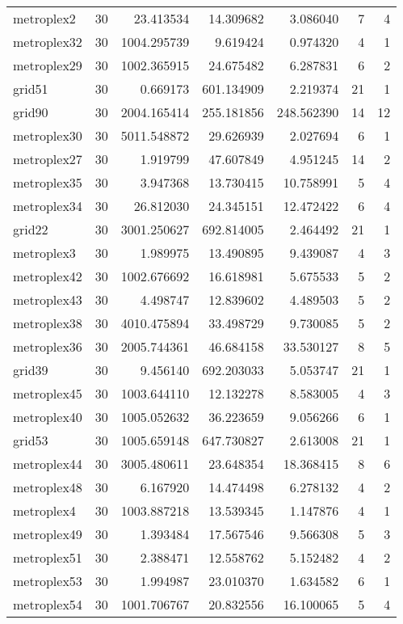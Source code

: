 \documentclass[../../../thesis.tex]{subfiles}
\begin{document}
\begin{longtable}{|l|r|r|r|r|r|r|}
metroplex2 & 30 & 23.413534 & 14.309682 & 3.086040 & 7 & 4 \\
metroplex32 & 30 & 1004.295739 & 9.619424 & 0.974320 & 4 & 1 \\
metroplex29 & 30 & 1002.365915 & 24.675482 & 6.287831 & 6 & 2 \\
grid51 & 30 & 0.669173 & 601.134909 & 2.219374 & 21 & 1 \\
grid90 & 30 & 2004.165414 & 255.181856 & 248.562390 & 14 & 12 \\
metroplex30 & 30 & 5011.548872 & 29.626939 & 2.027694 & 6 & 1 \\
metroplex27 & 30 & 1.919799 & 47.607849 & 4.951245 & 14 & 2 \\
metroplex35 & 30 & 3.947368 & 13.730415 & 10.758991 & 5 & 4 \\
metroplex34 & 30 & 26.812030 & 24.345151 & 12.472422 & 6 & 4 \\
grid22 & 30 & 3001.250627 & 692.814005 & 2.464492 & 21 & 1 \\
metroplex3 & 30 & 1.989975 & 13.490895 & 9.439087 & 4 & 3 \\
metroplex42 & 30 & 1002.676692 & 16.618981 & 5.675533 & 5 & 2 \\
metroplex43 & 30 & 4.498747 & 12.839602 & 4.489503 & 5 & 2 \\
metroplex38 & 30 & 4010.475894 & 33.498729 & 9.730085 & 5 & 2 \\
metroplex36 & 30 & 2005.744361 & 46.684158 & 33.530127 & 8 & 5 \\
grid39 & 30 & 9.456140 & 692.203033 & 5.053747 & 21 & 1 \\
metroplex45 & 30 & 1003.644110 & 12.132278 & 8.583005 & 4 & 3 \\
metroplex40 & 30 & 1005.052632 & 36.223659 & 9.056266 & 6 & 1 \\
grid53 & 30 & 1005.659148 & 647.730827 & 2.613008 & 21 & 1 \\
metroplex44 & 30 & 3005.480611 & 23.648354 & 18.368415 & 8 & 6 \\
metroplex48 & 30 & 6.167920 & 14.474498 & 6.278132 & 4 & 2 \\
metroplex4 & 30 & 1003.887218 & 13.539345 & 1.147876 & 4 & 1 \\
metroplex49 & 30 & 1.393484 & 17.567546 & 9.566308 & 5 & 3 \\
metroplex51 & 30 & 2.388471 & 12.558762 & 5.152482 & 4 & 2 \\
metroplex53 & 30 & 1.994987 & 23.010370 & 1.634582 & 6 & 1 \\
metroplex54 & 30 & 1001.706767 & 20.832556 & 16.100065 & 5 & 4 \\

\end{longtable}
\end{document}
